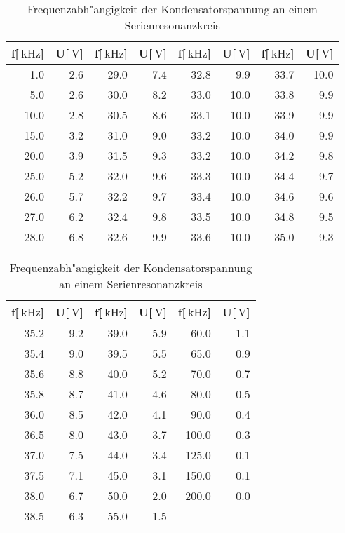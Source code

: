 \begin{table}[!h]
\begin{center}
\begin{tabular}{|r|r|r|r|r|r|r|r|}
\hline
f[$\SI{}{\kilo\hertz}$] & U[$\SI{}{\volt}$] & f[$\SI{}{\kilo\hertz}$] & U[$\SI{}{\volt}$] & f[$\SI{}{\kilo\hertz}$] & U[$\SI{}{\volt}$] & f[$\SI{}{\kilo\hertz}$] & U[$\SI{}{\volt}$] \\
\hline
\hline
1.0  & 2.6 & 29.0 & 7.4 & 32.8 & 9.9 & 33.7 & 10.0 \\
5.0  & 2.6 & 30.0 & 8.2 & 33.0 & 10.0 & 33.8 & 9.9 \\
10.0 & 2.8 & 30.5 & 8.6 & 33.1 & 10.0 & 33.9 & 9.9 \\
15.0 & 3.2 & 31.0 & 9.0 & 33.2 & 10.0 & 34.0 & 9.9 \\
20.0 & 3.9 & 31.5 & 9.3 & 33.2 & 10.0 & 34.2 & 9.8 \\
25.0 & 5.2 & 32.0 & 9.6 & 33.3 & 10.0 & 34.4 & 9.7 \\
26.0 & 5.7 & 32.2 & 9.7 & 33.4 & 10.0 & 34.6 & 9.6 \\
27.0 & 6.2 & 32.4 & 9.8 & 33.5 & 10.0 & 34.8 & 9.5 \\
28.0 & 6.8 & 32.6 & 9.9 & 33.6 & 10.0 & 35.0 & 9.3 \\
\hline
\end{tabular}
\end{center}
\begin{center}
\begin{tabular}{|r|r|r|r|r|r|}
\hline
f[$\SI{}{\kilo\hertz}$] & U[$\SI{}{\volt}$] & f[$\SI{}{\kilo\hertz}$] & U[$\SI{}{\volt}$] & f[$\SI{}{\kilo\hertz}$] & U[$\SI{}{\volt}$] \\
\hline
\hline
35.2 & 9.2 & 39.0 & 5.9 & 60.0 & 1.1 \\
35.4 & 9.0 & 39.5 & 5.5 & 65.0 & 0.9 \\
35.6 & 8.8 & 40.0 & 5.2 & 70.0 & 0.7 \\
35.8 & 8.7 & 41.0 & 4.6 & 80.0 & 0.5 \\
36.0 & 8.5 & 42.0 & 4.1 & 90.0 & 0.4 \\
36.5 & 8.0 & 43.0 & 3.7 & 100.0 & 0.3 \\
37.0 & 7.5 & 44.0 & 3.4 & 125.0 & 0.1 \\
37.5 & 7.1 & 45.0 & 3.1 & 150.0 & 0.1 \\
38.0 & 6.7 & 50.0 & 2.0 & 200.0 & 0.0 \\
38.5 & 6.3 & 55.0 & 1.5 &     & \\
\hline
\end{tabular}
\caption[Messwerte zu Aufgabenteil c]{Frequenzabh"angigkeit der Kondensatorspannung an einem Serienresonanzkreis}
\label{frequenz}
\end{center}
\end{table}
